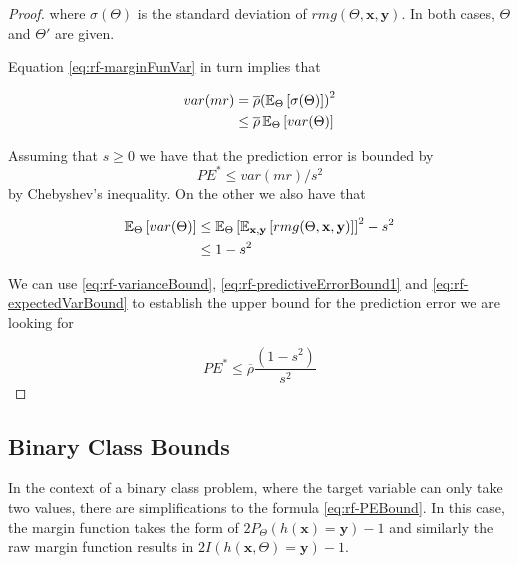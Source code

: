 \begin{appendices}
\begin{proof}
	where $\sigma(\Theta)$ is the standard deviation of $rmg(\Theta,\textbf{x},\textbf{y})$.
	In both cases, $\Theta$ and $\Theta'$ are given.%

	Equation \cref{eq:rf-marginFunVar} in turn implies that

	\begin{equation}\label{eq:rf-varianceBound}
	\begin{split}
	var(mr) & = \overline{\rho} {(\operatorname{\mathbb{E}}_{\Theta}\left[ \sigma(\Theta)\right] )}^2 \\
	& \leq \overline{\rho} \operatorname{\mathbb{E}}_{\Theta} \left[ var(\Theta) \right]
	\end{split}
	\end{equation}


	Assuming that $s \geq 0$ we have that the prediction error is bounded by
	\begin{equation}\label{eq:rf-predictiveErrorBound1}
	PE^* \leq var(mr)/s^2
	\end{equation}
	by Chebyshev's inequality.
	On the other we also have that

	\begin{equation}\label{eq:rf-expectedVarBound}
	\begin{split}
	\operatorname{\mathbb{E}}_{\Theta} \left[ var(\Theta) \right] & \leq \operatorname{\mathbb{E}}_{\Theta} {\left[ \operatorname{\mathbb{E}}_{\textbf{x},\textbf{y}}\left[ rmg(\Theta,\textbf{x},\textbf{y})  \right] \right]}^2 -s^2 \\
	& \leq 1-s^2
	\end{split}
	\end{equation}



	We can use \cref{eq:rf-varianceBound}, \cref{eq:rf-predictiveErrorBound1} and \cref{eq:rf-expectedVarBound} to establish the upper bound for the prediction error we are looking for

	\begin{equation}
	PE^* \leq \overline{\rho}\frac{(1-s^2)}{s^2}
	\end{equation}

\end{proof}

\subsection{Binary Class Bounds}\label{appx:subsec:random_forests_binary_class}

In the context of a binary class problem, where the target variable can only take two values, there are simplifications to the formula \cref{eq:rf-PEBound}.
In this case, the margin function takes the form of $2 P_{\Theta}(h(\textbf{x}) = \textbf{y}) -1$ and similarly the raw margin function results in $2 I(h(\textbf{x}, \Theta) = \textbf{y}) -1$.



\end{appendices}
